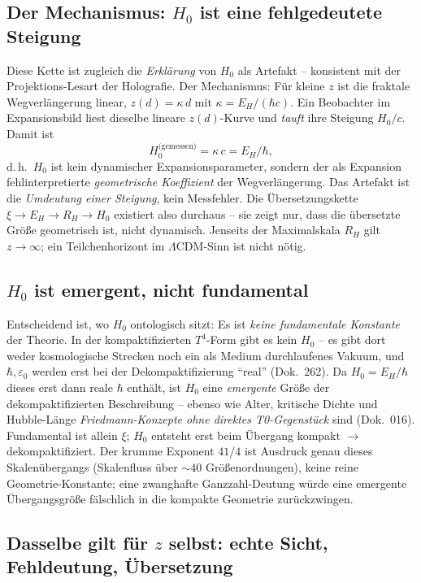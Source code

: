 \subsection*{Der Mechanismus: $H_0$ ist eine fehlgedeutete Steigung}

Diese Kette ist zugleich die \emph{Erklärung} von $H_0$ als Artefakt --
konsistent mit der Projektions-Lesart der Holografie. Der
Mechanismus: Für kleine $z$ ist die fraktale Wegverlängerung linear,
$z(d) = \kappa\,d$ mit $\kappa = E_H/(\hbar c)$. Ein Beobachter im
Expansionsbild liest dieselbe lineare $z(d)$-Kurve und \emph{tauft} ihre
Steigung $H_0/c$. Damit ist
\[
  H_0^{\text{(gemessen)}} = \kappa\,c = E_H/\hbar,
\]
d.\,h.\ $H_0$ ist kein dynamischer Expansionsparameter, sondern der als
Expansion fehlinterpretierte \emph{geometrische Koeffizient} der
Wegverlängerung. Das Artefakt ist die \emph{Umdeutung einer Steigung}, kein
Messfehler. Die Übersetzungskette $\xi \to E_H \to R_H \to H_0$ existiert also
durchaus -- sie zeigt nur, dass die übersetzte Größe geometrisch ist, nicht
dynamisch. Jenseits der Maximalskala $R_H$ gilt $z\to\infty$; ein
Teilchenhorizont im $\Lambda$CDM-Sinn ist nicht nötig.

\subsection*{$H_0$ ist emergent, nicht fundamental}

Entscheidend ist, wo $H_0$ ontologisch sitzt: Es ist \emph{keine fundamentale
Konstante} der Theorie. In der kompaktifizierten $T^4$-Form gibt es kein
$H_0$ -- es gibt dort weder kosmologische Strecken noch ein als Medium
durchlaufenes Vakuum, und $\hbar, \varepsilon_0$ werden erst bei der
Dekompaktifizierung \enquote{real} (Dok.~262). Da $H_0 = E_H/\hbar$ dieses
erst dann reale $\hbar$ enthält, ist $H_0$ eine \emph{emergente} Größe der
dekompaktifizierten Beschreibung -- ebenso wie Alter, kritische Dichte und
Hubble-Länge \emph{Friedmann-Konzepte ohne direktes T0-Gegenstück} sind
(Dok.~016). Fundamental ist allein $\xi$; $H_0$ entsteht erst beim Übergang
kompakt $\to$ dekompaktifiziert. Der krumme Exponent $41/4$ ist Ausdruck
genau dieses Skalenübergangs (Skalenfluss über $\sim 40$ Größenordnungen),
keine reine Geometrie-Konstante; eine zwanghafte Ganzzahl-Deutung würde eine
emergente Übergangsgröße fälschlich in die kompakte Geometrie zurückzwingen.

\subsection*{Dasselbe gilt für $z$ selbst: echte Sicht, Fehldeutung, Übersetzung}

